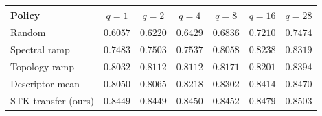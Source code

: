 \begin{tabular}{lcccccc}
\toprule
Policy & $q{=}1$ & $q{=}2$ & $q{=}4$ & $q{=}8$ & $q{=}16$ & $q{=}28$ \\
\midrule
Random & $0.6057$ & $0.6220$ & $0.6429$ & $0.6836$ & $0.7210$ & $0.7474$ \\
Spectral ramp & $0.7483$ & $0.7503$ & $0.7537$ & $0.8058$ & $0.8238$ & $0.8319$ \\
Topology ramp & $0.8032$ & $0.8112$ & $0.8112$ & $0.8171$ & $0.8201$ & $0.8394$ \\
Descriptor mean & $0.8050$ & $0.8065$ & $0.8218$ & $0.8302$ & $0.8414$ & $0.8470$ \\
STK transfer (ours) & $0.8449$ & $0.8449$ & $0.8450$ & $0.8452$ & $0.8479$ & $0.8503$ \\
\bottomrule
\end{tabular}
